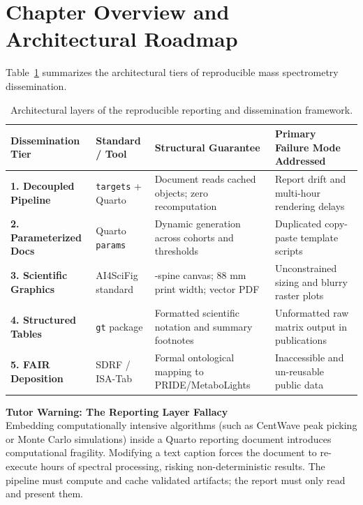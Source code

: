 \documentclass[11pt,twoside,openright]{book}
\begin{document}
\section*{Chapter Overview and Architectural Roadmap}

Table~\ref{tab:reporting_roadmap} summarizes the architectural tiers of reproducible mass spectrometry dissemination.

\begin{table}[htbp]
\centering
\caption{Architectural layers of the reproducible reporting and dissemination framework.}
\label{tab:reporting_roadmap}
\small
\begin{tabularx}{\textwidth}{>{\raggedright\arraybackslash}l >{\raggedright\arraybackslash}p{3.5cm} >{\raggedright\arraybackslash}X >{\raggedright\arraybackslash}p{2.8cm}}
\toprule
\textbf{Dissemination Tier} & \textbf{Standard / Tool} & \textbf{Structural Guarantee} & \textbf{Primary Failure Mode Addressed} \\
\midrule
\textbf{1. Decoupled Pipeline} & \texttt{targets} + Quarto \cite{landau2021targets, allaire2022quarto} & Document reads cached objects; zero recomputation & Report drift and multi-hour rendering delays \\
\addlinespace
\textbf{2. Parameterized Docs} & Quarto \texttt{params} \cite{allaire2022quarto} & Dynamic generation across cohorts and thresholds & Duplicated copy-paste template scripts \\
\addlinespace
\textbf{3. Scientific Graphics} & AI4SciFig standard \cite{cleveland1985elements} & 4-spine canvas; 88 mm print width; vector PDF & Unconstrained sizing and blurry raster plots \\
\addlinespace
\textbf{4. Structured Tables} & \texttt{gt} package \cite{mocking2023gt} & Formatted scientific notation and summary footnotes & Unformatted raw matrix output in publications \\
\addlinespace
\textbf{5. FAIR Deposition} & SDRF / ISA-Tab \cite{wilkinson2016fair, deutsch2020pride} & Formal ontological mapping to PRIDE/MetaboLights & Inaccessible and un-reusable public data \\
\bottomrule
\end{tabularx}
\end{table}

\begin{notebox}
\textbf{Tutor Warning: The Reporting Layer Fallacy}\\[0.4em]
Embedding computationally intensive algorithms (such as CentWave peak picking or Monte Carlo simulations) inside a Quarto reporting document introduces computational fragility. Modifying a text caption forces the document to re-execute hours of spectral processing, risking non-deterministic results. The pipeline must compute and cache validated artifacts; the report must only read and present them.
\end{notebox}
\end{document}
